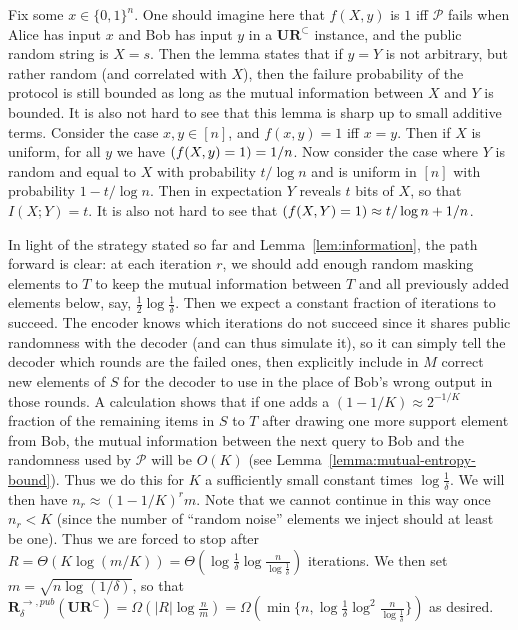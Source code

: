 \documentclass[11pt]{article}
\let\Pr\relax
\DeclareMathOperator*{\Pr}{\mathbb{P}}
\newcommand{\ur}{\mathbf{UR}\xspace}
\newcommand{\randcom}{\mathbf{R}}
\begin{document}
Fix some $x\in\{0,1\}^n$. One should imagine here that $f(X,y)$ is $1$ iff $\mathcal{P}$ fails when Alice has input $x$ and Bob has input $y$ in a $\ur^\subset$ instance, and the public random string is $X=s$. Then the lemma states that if $y=Y$ is not arbitrary, but rather random (and correlated with $X$), then the failure probability of the protocol is still bounded as long as the mutual information between $X$ and $Y$ is bounded. It is also not hard to see that this lemma is sharp up to small additive terms. Consider the case $x,y\in[n]$, and $f(x,y) = 1$ iff $x = y$. Then if $X$ is uniform, for all $y$ we have $\Pr(f(X,y) = 1) = 1/n$. Now consider the case where $Y$ is random and equal to $X$ with probability $t/\log n$ and is uniform in $[n]$ with probability $1 - t/\log n$. Then in expectation $Y$ reveals $t$ bits of $X$, so that $I(X;Y) = t$. It is also not hard to see that $\Pr(f(X,Y) = 1) \approx t/\log n + 1/n$.

In light of the strategy stated so far and Lemma~\ref{lem:information}, the path forward is clear: at each iteration $r$, we should add enough random masking elements to $T$ to keep the mutual information between $T$ and all previously added elements below, say, $\frac 12 \log \frac 1{\delta}$. Then we expect a constant fraction of iterations to succeed. The encoder knows which iterations do not succeed since it shares public randomness with the decoder (and can thus simulate it), so it can simply tell the decoder which rounds are the failed ones, then explicitly include in $M$ correct new elements of $S$ for the decoder to use in the place of Bob's wrong output in those rounds. A calculation shows that if one adds a $(1-1/K)\approx 2^{-1/K}$ fraction of the remaining items in $S$ to $T$ after drawing one more support element from Bob, the mutual information between the next query to Bob and the randomness used by $\mathcal{P}$ will be $O(K)$ (see Lemma~\ref{lemma:mutual-entropy-bound}). Thus we do this for $K$ a sufficiently small constant times $\log \frac 1{\delta}$. We will then have $n_r \approx (1 - 1/K)^r m$. Note that we cannot continue in this way once $n_r < K$ (since the number of ``random noise'' elements we inject should at least be one). Thus we are forced to stop after $R = \Theta(K\log(m/K)) = \Theta(\log\frac 1{\delta} \log\frac n{\log \frac 1{\delta}})$ iterations. We then set $m = \sqrt{n\log(1/\delta)}$, so that $\randcom^{\rightarrow,pub}_\delta(\ur^\subset) = \Omega(|R|\log \frac nm) = \Omega(\min\{n, \log\frac 1{\delta}\log^2 \frac n{\log \frac 1{\delta}}\})$ as desired.
\end{document}
